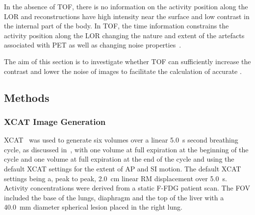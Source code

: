        In the absence of \gls{TOF}, there is no information on the activity position along the \gls{LOR} and  reconstructions have high intensity near the surface and low contrast in the internal part of the body. In \gls{TOF}, the time information constrains the activity position along the \gls{LOR} changing the nature and extent of the artefacts associated with  \gls{PET} as well as changing noise properties~.
        
        The aim of this section is to investigate whether \gls{TOF} can sufficiently increase the contrast and lower the noise of  images to facilitate the calculation of accurate .
        
        \subsection{Methods} \label{sec:impact_of_tof_on_respiratory_motion_model_estimation_using_pre_gated_no_intra_cycle_motion_nac_pet_methods}
            \subsubsection{XCAT Image Generation} \label{sec:impact_of_tof_on_respiratory_motion_model_estimation_using_pre_gated_no_intra_cycle_motion_nac_pet_methods_xcat_image_generation}
                \gls{XCAT}~ was used to generate six volumes over a linear \SI{5.0}{\second} second breathing cycle, as discussed in~, with one volume at full expiration at the beginning of the cycle and one volume at full expiration at the end of the cycle and using the default \gls{XCAT} settings for the extent of \gls{AP} and \gls{SI} motion. The default \gls{XCAT} settings being a, peak to peak, \SI{2.0}{\centi\metre} linear \gls{RM} displacement over \SI{5.0}{\second}. Activity concentrations were derived from a static \gls{F-FDG} patient scan. The \gls{FOV} included the base of the lungs, diaphragm and the top of the liver with a \SI{40.0}{\milli\metre} diameter spherical lesion placed in the right lung.
            

